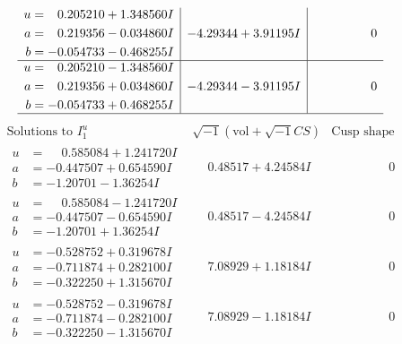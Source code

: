 \documentclass[1p]{elsarticle_modified}
\theoremstyle{definition}
\newcommand{\I}{\sqrt{-1}}
\begin{document}
$$\begin{array}{c|c|c}
\begin{aligned}
u &= \phantom{-}0.205210 + 1.348560 I \\
a &= \phantom{-}0.219356 - 0.034860 I \\
b &= -0.054733 - 0.468255 I\end{aligned}
 & -4.29344 + 3.91195 I & \phantom{-0.000000 } 0 \\ \hline\begin{aligned}
u &= \phantom{-}0.205210 - 1.348560 I \\
a &= \phantom{-}0.219356 + 0.034860 I \\
b &= -0.054733 + 0.468255 I\end{aligned}
 & -4.29344 - 3.91195 I & \phantom{-0.000000 } 0\\
 \hline 
 \end{array}$$\newpage$$\begin{array}{c|c|c}  
\text{Solutions to }I^u_{1}& \I (\text{vol} + \sqrt{-1}CS) & \text{Cusp shape}\\
 \hline 
\begin{aligned}
u &= \phantom{-}0.585084 + 1.241720 I \\
a &= -0.447507 + 0.654590 I \\
b &= -1.20701 - 1.36254 I\end{aligned}
 & \phantom{-}0.48517 + 4.24584 I & \phantom{-0.000000 } 0 \\ \hline\begin{aligned}
u &= \phantom{-}0.585084 - 1.241720 I \\
a &= -0.447507 - 0.654590 I \\
b &= -1.20701 + 1.36254 I\end{aligned}
 & \phantom{-}0.48517 - 4.24584 I & \phantom{-0.000000 } 0 \\ \hline\begin{aligned}
u &= -0.528752 + 0.319678 I \\
a &= -0.711874 + 0.282100 I \\
b &= -0.322250 + 1.315670 I\end{aligned}
 & \phantom{-}7.08929 + 1.18184 I & \phantom{-0.000000 } 0 \\ \hline\begin{aligned}
u &= -0.528752 - 0.319678 I \\
a &= -0.711874 - 0.282100 I \\
b &= -0.322250 - 1.315670 I\end{aligned}
 & \phantom{-}7.08929 - 1.18184 I & \phantom{-0.000000 } 0 \\ \hline\begin{aligned}

\end{aligned}
\end{array}$$
\end{document}
